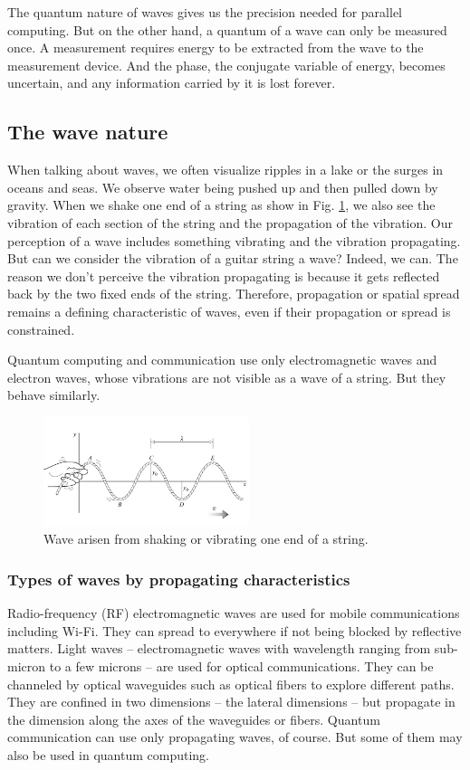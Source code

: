 \documentclass{book}
\begin{document}
The quantum nature of waves gives us the precision needed for parallel computing. But on the other hand, a quantum of a wave can only be measured once. A measurement requires energy to be extracted from the wave to the measurement device. And the phase, the conjugate variable of energy, becomes uncertain, and any information carried by it is lost forever.

\subsection{The wave nature}
When talking about waves, we often visualize ripples in a lake or the surges in oceans and seas. We observe water being pushed up and then pulled down by gravity. When we shake one end of a string as show in Fig. \ref{String}, we also see the vibration of each section of the string and the propagation of the vibration. Our perception of a wave includes something vibrating and the vibration propagating. But can we consider the vibration of a guitar string a wave? Indeed, we can. The reason we don't perceive the vibration propagating is because it gets reflected back by the two fixed ends of the string. Therefore, propagation or spatial spread remains a defining characteristic of waves, even if their propagation or spread is constrained.

Quantum computing and communication use only electromagnetic waves and electron waves, whose vibrations are not visible as a wave of a string. But they behave similarly.

\begin{figure}[ht]
\includegraphics[width=6cm]{pic/wave-in-a-string.png}
\caption{Wave arisen from shaking or vibrating one end of a string.}
\label{String}
\end{figure}

\subsubsection{Types of waves by propagating characteristics}
Radio-frequency (RF) electromagnetic waves are used for mobile communications including Wi-Fi. They can spread to everywhere if not being blocked by reflective matters. Light waves -- electromagnetic waves with wavelength ranging from sub-micron to a few microns -- are used for optical communications. They can be channeled by optical waveguides such as optical fibers to explore different paths. They are confined in two dimensions -- the lateral dimensions -- but propagate in the dimension along the axes of the waveguides or fibers. Quantum communication can use only propagating waves, of course. But some of them may also be used in quantum computing.
\end{document}
